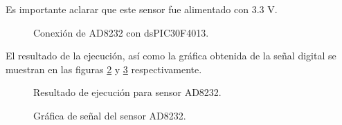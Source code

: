 Es importante aclarar que este sensor fue alimentado con 3.3 V.\\

	\begin{figure}[htbp!]
		\centering
		\caption{Conexión de AD8232 con dsPIC30F4013.}
		\label{fig:ConexionAD8232}
	\end{figure}
	
El resultado de la ejecución, así como la gráfica obtenida de la señal digital se muestran en las figuras \ref{fig:TerminalAD8232} y \ref{fig:GraficaAD8232} respectivamente.\\

	\begin{figure}[htbp!]
		\centering
		\caption{Resultado de ejecución para sensor AD8232.}
		\label{fig:TerminalAD8232}
	\end{figure}
	
	\begin{figure}[htbp!]
		\centering
		\caption{Gráfica de señal del sensor AD8232.}
		\label{fig:GraficaAD8232}
	\end{figure}
	
